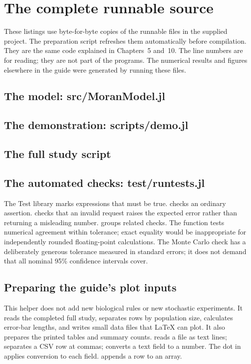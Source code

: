 \chapter{The complete runnable source}
\label{app:source}
These listings use byte-for-byte copies of the runnable files in the supplied project. The preparation script refreshes them automatically before compilation. They are the same code explained in Chapters~5 and~10. The line numbers are for reading; they are not part of the programs. The numerical results and figures elsewhere in the guide were generated by running these files.

\section{The model: src/MoranModel.jl}


\section{The demonstration: scripts/demo.jl}


\section{The full study script}


\section{The automated checks: test/runtests.jl}
The Test library marks expressions that must be true.  checks an ordinary assertion.  checks that an invalid request raises the expected error rather than returning a misleading number.  groups related checks. The function  tests numerical agreement within tolerance; exact equality would be inappropriate for independently rounded floating-point calculations. The Monte Carlo check has a deliberately generous tolerance measured in standard errors; it does not demand that all nominal 95\% confidence intervals cover.


\section{Preparing the guide's plot inputs}
This helper does not add new biological rules or new stochastic experiments. It reads the completed full study, separates rows by population size, calculates error-bar lengths, and writes small data files that LaTeX can plot. It also prepares the printed tables and summary counts.  reads a file as text lines;  separates a CSV row at commas;  converts a text field to a number. The dot in  applies conversion to each field.  appends a row to an array.

